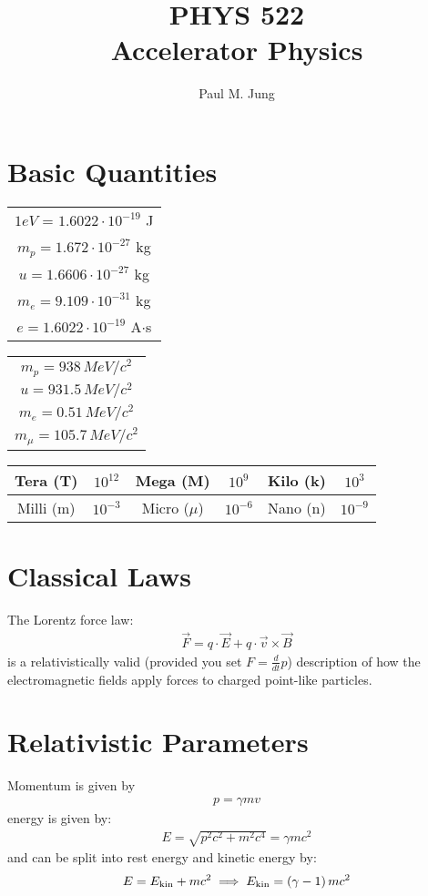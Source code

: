 \documentclass{article}
\title{PHYS 522 \\ Accelerator Physics}
\author{ Paul M. Jung }
\numberwithin{equation}{section}
\begin{document}
\maketitle

\tableofcontents

\section{Basic Quantities}

\begin{center}
\begin{tabular}{ c }
$1 eV$ = $1.6022 \cdot 10^{-19}$ J \\
$m_p = 1.672 \cdot 10^{-27}$ kg \\
$u = 1.6606 \cdot 10^{-27}$ kg \\
$m_e = 9.109 \cdot 10^{-31} $ kg \\
$e = 1.6022 \cdot 10^{-19}$ A$\cdot$s
\end{tabular}
\quad
\begin{tabular}{ c }
$m_p = 938 \,\si{MeV/c^2}$ \\
$u = 931.5 \,\si{MeV/c^2} $ \\
$m_e = 0.51 \,\si{MeV/c^2}$ \\
$m_\mu = 105.7 \,\si{MeV/c^2}$ 
\end{tabular}
\end{center}
\begin{center}
\begin{tabular}{ c c | c c | c c  }
Tera (T) & $10^{12}$ & Mega (M) & $10^9$ & Kilo (k) & $10^3$ \\ \hline
Milli (m) & $10^{-3}$ & Micro ($\mu$) & $10^{-6}$ & Nano (n) & $10^{-9}$ 
\end{tabular}
\end{center}

\section{Classical Laws}
The Lorentz force law:
\begin{align}
\vec{F} = q \cdot \vec{E} + q \cdot \vec{v} \times \vec{B}
\end{align}
is a relativistically valid (provided you set $F = \frac{d}{dt} p$) description of how the electromagnetic fields apply forces to charged point-like particles.

\section{Relativistic Parameters}
Momentum is given by 
\begin{align}
p = \gamma m v
\end{align}
energy is given by:
\begin{align}
E = \sqrt{p^2 c^2 + m^2 c^4} = \gamma mc^2
\end{align}
and can be split into rest energy and kinetic energy by:
\begin{align}
E = E_{\rm kin} + m c^2 \implies E_{\rm kin} = \left( \gamma -1 \right) m c^2
\end{align}
\end{document}
